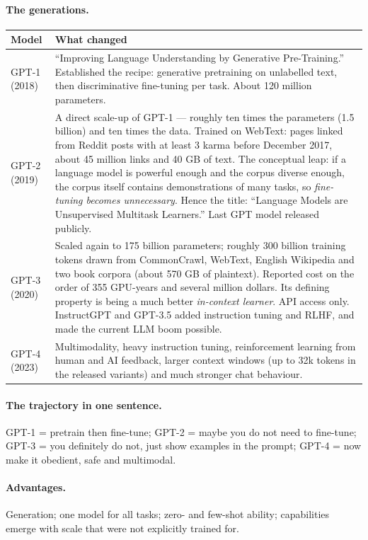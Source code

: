 \documentclass[11pt,a4paper]{article}
\begin{document}
\paragraph{The generations.}
\begin{center}
\begin{tabularx}{\textwidth}{lY}
\textbf{Model} & \textbf{What changed} \\
\hline
GPT-1 (2018) & ``Improving Language Understanding by Generative Pre-Training.''
Established the recipe: generative pretraining on unlabelled text, then discriminative
fine-tuning per task. About 120 million parameters. \\
GPT-2 (2019) & A direct scale-up of GPT-1 --- roughly ten times the parameters (1.5 billion)
and ten times the data. Trained on WebText: pages linked from Reddit posts with at least 3
karma before December 2017, about 45 million links and 40 GB of text. The conceptual leap:
if a language model is powerful enough and the corpus diverse enough, the corpus itself
contains demonstrations of many tasks, so \emph{fine-tuning becomes unnecessary}. Hence the
title: ``Language Models are Unsupervised Multitask Learners.'' Last GPT model released
publicly. \\
GPT-3 (2020) & Scaled again to 175 billion parameters; roughly 300 billion training tokens
drawn from CommonCrawl, WebText, English Wikipedia and two book corpora (about 570 GB of
plaintext). Reported cost on the order of 355 GPU-years and several million dollars. Its
defining property is being a much better \emph{in-context learner}. API access only.
InstructGPT and GPT-3.5 added instruction tuning and RLHF, and made the current LLM boom
possible. \\
GPT-4 (2023) & Multimodality, heavy instruction tuning, reinforcement learning from human and
AI feedback, larger context windows (up to 32k tokens in the released variants) and much
stronger chat behaviour. \\
\end{tabularx}
\end{center}

\paragraph{The trajectory in one sentence.} GPT-1 = pretrain then fine-tune; GPT-2 = maybe you
do not need to fine-tune; GPT-3 = you definitely do not, just show examples in the prompt;
GPT-4 = now make it obedient, safe and multimodal.

\paragraph{Advantages.} Generation; one model for all tasks; zero- and few-shot ability;
capabilities emerge with scale that were not explicitly trained for.
\end{document}

